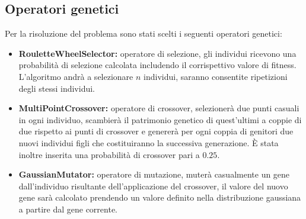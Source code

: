 \documentclass[a4paper, 11pt, oneside]{report}
\begin{document}
                \subsection{Operatori genetici}
                Per la risoluzione del problema sono stati scelti i seguenti operatori genetici:
                \begin{itemize}
                    \item \textbf{RouletteWheelSelector:} operatore di selezione, gli individui ricevono una probabilità
                    di selezione calcolata includendo il corrispettivo valore di fitness. L'algoritmo andrà a selezionare
                    $n$ individui, saranno consentite ripetizioni degli stessi individui.
                    \item \textbf{MultiPointCrossover:} operatore di crossover, selezionerà due punti casuali in ogni
                    individuo, scambierà il patrimonio genetico di quest'ultimi a coppie di due rispetto ai punti di
                    crossover e genererà per ogni coppia di genitori due nuovi individui figli che costituiranno la
                    successiva generazione. È stata inoltre inserita una probabilità di crossover pari a $0.25$.
                    \item \textbf{GaussianMutator:} operatore di mutazione, muterà casualmente un gene dall'individuo
                    risultante dell'applicazione del crossover, il valore del nuovo gene sarà calcolato prendendo un
                    valore definito nella distribuzione gaussiana a partire dal gene corrente.
                \end{itemize}
\end{document}
